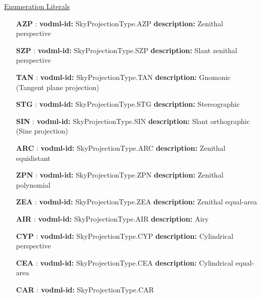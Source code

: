   \noindent \underline{Enumeration Literals}
  \vspace{-\parsep}
  \small
  \begin{itemize}
  
    \item[\textbf{AZP}]: \textbf{vodml-id:} SkyProjectionType.AZP \newline
          \textbf{description:} Zenithal perspective
    \item[\textbf{SZP}]: \textbf{vodml-id:} SkyProjectionType.SZP \newline
          \textbf{description:} Slant zenithal perspective
    \item[\textbf{TAN}]: \textbf{vodml-id:} SkyProjectionType.TAN \newline
          \textbf{description:} Gnomonic (Tangent plane projection)
    \item[\textbf{STG}]: \textbf{vodml-id:} SkyProjectionType.STG \newline
          \textbf{description:} Stereographic
    \item[\textbf{SIN}]: \textbf{vodml-id:} SkyProjectionType.SIN \newline
          \textbf{description:} Slant orthographic (Sine projection)
    \item[\textbf{ARC}]: \textbf{vodml-id:} SkyProjectionType.ARC \newline
          \textbf{description:} Zenithal equidistant
    \item[\textbf{ZPN}]: \textbf{vodml-id:} SkyProjectionType.ZPN \newline
          \textbf{description:} Zenithal polynomial
    \item[\textbf{ZEA}]: \textbf{vodml-id:} SkyProjectionType.ZEA \newline
          \textbf{description:} Zenithal equal-area
    \item[\textbf{AIR}]: \textbf{vodml-id:} SkyProjectionType.AIR \newline
          \textbf{description:} Airy
    \item[\textbf{CYP}]: \textbf{vodml-id:} SkyProjectionType.CYP \newline
          \textbf{description:} Cylindrical perspective
    \item[\textbf{CEA}]: \textbf{vodml-id:} SkyProjectionType.CEA \newline
          \textbf{description:} Cylindrical equal-area
    \item[\textbf{CAR}]: \textbf{vodml-id:} SkyProjectionType.CAR \newline

\end{itemize}
